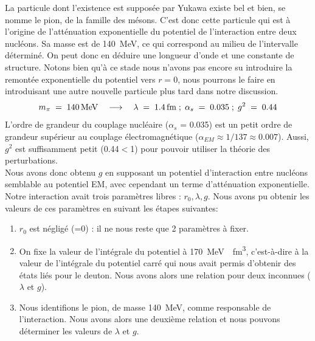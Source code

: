 La particule dont l'existence est supposée par Yukawa existe bel et bien, se nomme le pion, de la famille des mésons. C'est donc cette particule qui est à l'origine de l'atténuation exponentielle du potentiel de l'interaction entre deux nucléons. Sa masse est de \SI{140}{MeV}, ce qui correspond au milieu de l'intervalle déterminé. On peut donc en déduire une longueur d'onde et une constante de structure. Notons bien qu'à ce stade nous n'avons pas encore su introduire la remontée exponentielle du potentiel vers $r=0$, nous pourrons le faire en introduisant une autre nouvelle particule plus tard dans notre discussion.
\[
    m_\pi \; = \; \SI{140}{MeV} \quad \longrightarrow \quad \lambda \; = \; \SI{1.4}{fm}\;;\;\alpha_s \; = \; 0.035\;;\; g^2\; = \; 0.44
\]
L'ordre de grandeur du couplage nucléaire ($\alpha_s$ = 0.035) est un petit ordre de grandeur supérieur au couplage électromagnétique ($\alpha_{EM} \approx 1/137 \approx 0.007$). Aussi, $g^2$ est suffisamment petit (0.44$<$1) pour pouvoir utiliser la théorie des perturbations.\\

Nous avons donc obtenu $g$ en supposant un potentiel d'interaction entre nucléons semblable au potentiel EM, avec cependant un terme d'atténuation exponentielle. Notre interaction avait trois paramètres libres : $r_0, \lambda, g$. Nous avons pu obtenir les valeurs de ces paramètres en suivant les étapes suivantes:
\begin{enumerate}
    \item $r_0$ est négligé (=0) : il ne nous reste que 2 paramètres à fixer.
    
    \item On fixe la valeur de l'intégrale du potentiel à \SI{170}{MeV \cdot fm^3}, c'est-à-dire à la valeur de l'intégrale du potentiel carré qui nous avait permis d'obtenir des états liés pour le deuton. Nous avons alors une relation pour deux inconnues ($\lambda$ et $g$).
    
    \item Nous identifions le pion, de masse \SI{140}{MeV}, comme responsable de l'interaction. Nous avons alors une deuxième relation et nous pouvons déterminer les valeurs de $\lambda$ et $g$.\\
\end{enumerate}


